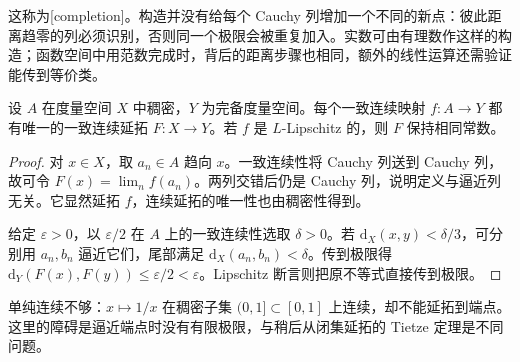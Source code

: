 这称为[completion]。构造并没有给每个 Cauchy 列增加一个不同的新点：彼此距离趋零的列必须识别，否则同一个极限会被重复加入。实数可由有理数作这样的构造；函数空间中用范数完成时，背后的距离步骤也相同，额外的线性运算还需验证能传到等价类。

\begin{proposition}[一致连续延拓]\label{b1:prop:app-uniform-extension}
设 \(A\) 在度量空间 \(X\) 中稠密，\(Y\) 为完备度量空间。每个一致连续映射 \(f:A\rightarrow Y\) 都有唯一的一致连续延拓 \(F:X\rightarrow Y\)。若 \(f\) 是 \(L\)-Lipschitz 的，则 \(F\) 保持相同常数。
\end{proposition}
\begin{proof}
对 \(x\in X\)，取 \(a_n\in A\) 趋向 \(x\)。一致连续性将 Cauchy 列送到 Cauchy 列，故可令 \(F(x)=\lim_n f(a_n)\)。两列交错后仍是 Cauchy 列，说明定义与逼近列无关。它显然延拓 \(f\)，连续延拓的唯一性也由稠密性得到。

给定 \(\varepsilon>0\)，以 \(\varepsilon/2\) 在 \(A\) 上的一致连续性选取 \(\delta>0\)。若 \(\mathrm{d}_X(x,y)<\delta/3\)，可分别用 \(a_n,b_n\) 逼近它们，尾部满足 \(\mathrm{d}_X(a_n,b_n)<\delta\)。传到极限得 \(\mathrm{d}_Y(F(x),F(y))\le\varepsilon/2<\varepsilon\)。Lipschitz 断言则把原不等式直接传到极限。
\end{proof}

单纯连续不够：\(x\mapsto1/x\) 在稠密子集 \((0,1]\subset[0,1]\) 上连续，却不能延拓到端点。这里的障碍是逼近端点时没有有限极限，与稍后从闭集延拓的 Tietze 定理是不同问题。
